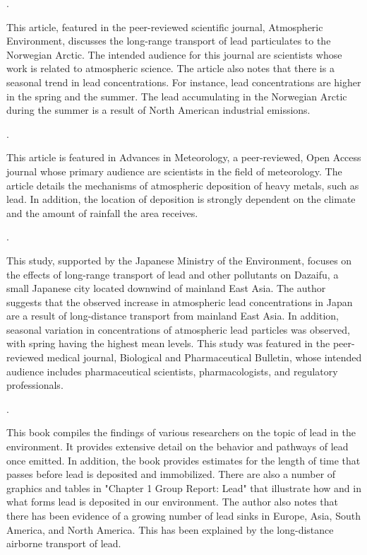 \documentclass{article}\usepackage[]{graphicx}\usepackage[]{color}
\begin{document}
\medskip

\noindent {}.

\medskip

This article, featured in the peer-reviewed scientific journal, Atmospheric Environment, discusses the long-range transport of lead particulates to the Norwegian Arctic. The intended audience for this journal are scientists whose work is related to atmospheric science. The article also notes that there is a seasonal trend in lead concentrations. For instance, lead concentrations are higher in the spring and the summer. The lead accumulating in the Norwegian Arctic during the summer is a result of North American industrial emissions. 
\medskip

\noindent {}.

\medskip

This article is featured in Advances in Meteorology, a peer-reviewed, Open Access journal whose primary audience are scientists in the field of meteorology. The article details the mechanisms of atmospheric deposition of heavy metals, such as lead. In addition, the location of deposition is strongly dependent on the climate and the amount of rainfall the area receives. 

\medskip

\noindent {}.

\medskip

This study, supported by the Japanese Ministry of the Environment, focuses on the effects of long-range transport of lead and other pollutants on Dazaifu, a small Japanese city located downwind of mainland East Asia. The author suggests that the observed increase in atmospheric lead concentrations in Japan are a result of long-distance transport from mainland East Asia. In addition, seasonal variation in concentrations of atmospheric lead particles was observed, with spring having the highest mean levels. This study was featured in the peer-reviewed medical journal, Biological and Pharmaceutical Bulletin, whose intended audience includes pharmaceutical scientists, pharmacologists, and regulatory professionals. 

\medskip

\noindent {}.

\medskip

This book compiles the findings of various researchers on the topic of lead in the environment. It provides extensive detail on the behavior and pathways of lead once emitted. In addition, the book provides estimates for the length of time that passes before lead is deposited and immobilized. There are also a number of graphics and tables in "Chapter 1 Group Report: Lead" that illustrate how and in what forms lead is deposited in our environment. The author also notes that there has been evidence of a growing number of lead sinks in Europe, Asia, South America, and North America. This has been explained by the long-distance airborne transport of lead.
\end{document}
